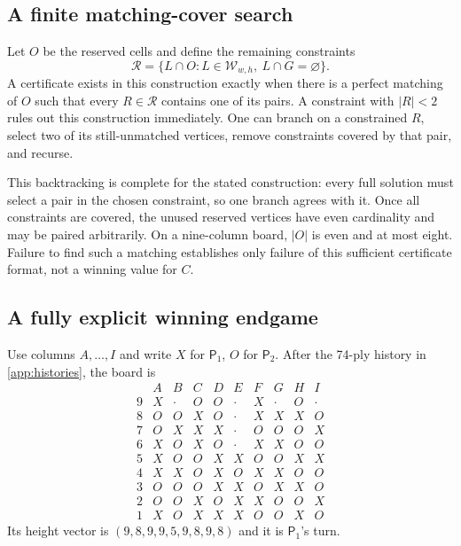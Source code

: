 \documentclass[11pt]{article}
\theoremstyle{definition}
\theoremstyle{remark}
\newcommand{\Pone}{\mathsf{P}_1}
\newcommand{\Ptwo}{\mathsf{P}_2}
\newcommand{\W}{\mathcal W}
\begin{document}
\subsection[Matching-cover search]{A finite matching-cover search}
Let $O$ be the reserved cells and define the remaining constraints
\[
 \mathcal R=\{L\cap O:L\in\W_{w,h},\ L\cap G=\varnothing\}.
\]
A certificate exists in this construction exactly when there is a perfect
matching of $O$ such that every $R\in\mathcal R$ contains one of its
pairs. A constraint with $|R|<2$ rules out this construction immediately.
One can branch on a constrained $R$, select two of its still-unmatched
vertices, remove constraints covered by that pair, and recurse.

This backtracking is complete for the stated construction: every full
solution must select a pair in the chosen constraint, so one branch agrees
with it. Once all constraints are covered, the unused reserved vertices
have even cardinality and may be paired arbitrarily. On a nine-column
board, $|O|$ is even and at most eight. Failure to find such a matching
establishes only failure of this sufficient certificate format, not a
winning value for $C$.

\subsection[Explicit winning endgame]{A fully explicit winning endgame}\label{sec:endgame}
Use columns $A,\ldots,I$ and write $X$ for $\Pone$, $O$ for $\Ptwo$.
After the 74-ply history in \cref{app:histories}, the board is
\begin{equation}\label{eq:endboard}
\begin{array}{c|ccccccccc}
 &A&B&C&D&E&F&G&H&I\\\hline
9&X&\cdot&O&O&\cdot&X&\cdot&O&\cdot\\
8&O&O&X&O&\cdot&X&X&X&O\\
7&O&X&X&X&\cdot&O&O&O&X\\
6&X&O&X&O&\cdot&X&X&O&O\\
5&X&O&O&X&X&O&O&X&X\\
4&X&X&O&X&O&X&X&O&O\\
3&O&O&O&X&X&O&X&X&O\\
2&O&O&X&O&X&X&O&O&X\\
1&X&O&X&X&X&O&O&X&O
\end{array}
\end{equation}
Its height vector is $(9,8,9,9,5,9,8,9,8)$ and it is $\Pone$'s turn.
\end{document}
